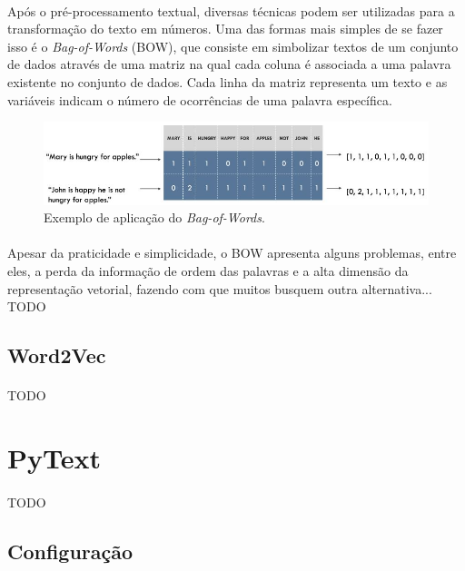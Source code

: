 \documentclass[grad,numbers]{coppe}
\begin{document}
  		\paragraph{}Após o pré-processamento textual, diversas técnicas podem ser utilizadas para a transformação do texto em números. Uma das formas mais simples de se fazer isso é o \textit{Bag-of-Words} (BOW), que consiste em simbolizar textos de um conjunto de dados através de uma matriz na qual cada coluna é associada a uma palavra existente no conjunto de dados. Cada linha da matriz representa um texto e as variáveis indicam o número de ocorrências de uma palavra específica.
  		\begin{figure}[h]
  			\includegraphics[width=15cm]{bow-example.jpg}
  			\caption{Exemplo de aplicação do \textit{Bag-of-Words}\cite{bow-example}.}
  			\label{fig:bow-example-fig}
  		\end{figure}
  		\paragraph{}Apesar da praticidade e simplicidade, o BOW apresenta alguns problemas, entre eles, a perda da informação de ordem das palavras e a alta dimensão da representação vetorial, fazendo com que muitos busquem outra alternativa... TODO
  		\subsection{Word2Vec}
  			\paragraph{}TODO
	
  \section{PyText}
  	\paragraph{}TODO
  	\subsection{Configuração}
\end{document}
